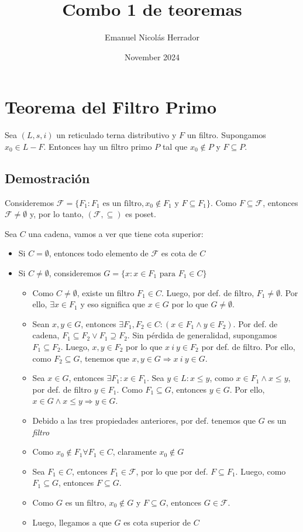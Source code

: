 \documentclass{article}
\title{Combo 1 de teoremas}
\author{Emanuel Nicolás Herrador}
\date{November 2024}
\begin{document}
\maketitle

\section*{Teorema del Filtro Primo}
Sea $(L,s,i)$ un reticulado terna distributivo y $F$ un filtro. Supongamos $x_0\in L-F$. Entonces hay un filtro primo $P$ tal que $x_0\notin P$ y $F\subseteq P$.
\subsection*{Demostración}
Consideremos $\mathcal{F}=\{F_1:F_1\text{ es un filtro},x_0\notin F_1\text{ y }F\subseteq F_1\}$. Como $F\subseteq\mathcal{F}$, entonces $\mathcal{F}\neq\emptyset$ y, por lo tanto, $(\mathcal{F},\subseteq)$ es poset.

Sea $C$ una cadena, vamos a ver que tiene cota superior:
\begin{itemize}
  \item Si $C=\emptyset$, entonces todo elemento de $\mathcal{F}$ es cota de $C$
  \item Si $C\neq\emptyset$, consideremos $G=\{x:x\in F_1\text{ para }F_1\in C\}$
        \begin{itemize}
          \item Como $C\neq\emptyset$, existe un filtro $F_1\in C$. Luego, por def. de filtro, $F_1\neq\emptyset$. Por ello, $\exists x\in F_1$ y eso significa que $x\in G$ por lo que $G\neq\emptyset$.
          \item Sean $x,y\in G$, entonces $\exists F_1,F_2\in C:(x\in F_1\land y\in F_2)$. Por def. de cadena, $F_1\subseteq F_2\lor F_1\supseteq F_2$. Sin pérdida de generalidad, supongamos $F_1\subseteq F_2$. Luego, $x,y\in F_2$ por lo que $x\ i\ y\in F_2$ por def. de filtro. Por ello, como $F_2\subseteq G$, tenemos que $x,y\in G\Rightarrow x\ i\ y\in G$.
          \item Sea $x\in G$, entonces $\exists F_1:x\in F_1$. Sea $y\in L:x\leq y$, como $x\in F_1\land x\leq y$, por def. de filtro $y\in F_1$. Como $F_1\subseteq G$, entonces $y\in G$. Por ello, $x\in G\wedge x\leq y\Rightarrow y\in G$.
          \item Debido a las tres propiedades anteriores, por def. tenemos que $G$ es un \textit{filtro}
          \item Como $x_0\notin F_1\forall F_1\in C$, claramente $x_0\notin G$
          \item Sea $F_1\in C$, entonces $F_1\in\mathcal{F}$, por lo que por def. $F\subseteq F_1$. Luego, como $F_1\subseteq G$, entonces $F\subseteq G$.
          \item Como $G$ es un filtro, $x_0\notin G$ y $F\subseteq G$, entonces $G\in\mathcal{F}$.
          \item Luego, llegamos a que $G$ es cota superior de $C$
        \end{itemize}
\end{itemize}
\end{document}
